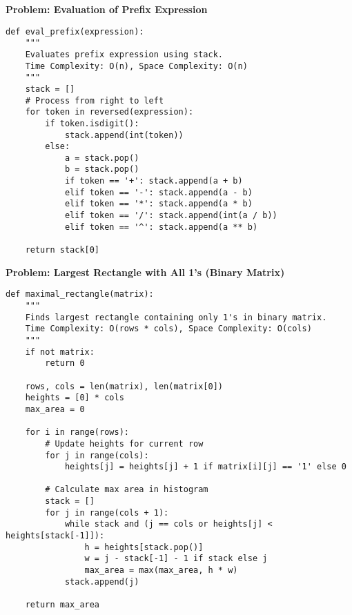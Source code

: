 \noindent\textbf{Problem: Evaluation of Prefix Expression}
\begin{verbatim}
def eval_prefix(expression):
    """
    Evaluates prefix expression using stack.
    Time Complexity: O(n), Space Complexity: O(n)
    """
    stack = []
    # Process from right to left
    for token in reversed(expression):
        if token.isdigit():
            stack.append(int(token))
        else:
            a = stack.pop()
            b = stack.pop()
            if token == '+': stack.append(a + b)
            elif token == '-': stack.append(a - b)
            elif token == '*': stack.append(a * b)
            elif token == '/': stack.append(int(a / b))
            elif token == '^': stack.append(a ** b)
    
    return stack[0]
\end{verbatim}

\noindent\textbf{Problem: Largest Rectangle with All 1's (Binary Matrix)}
\begin{verbatim}
def maximal_rectangle(matrix):
    """
    Finds largest rectangle containing only 1's in binary matrix.
    Time Complexity: O(rows * cols), Space Complexity: O(cols)
    """
    if not matrix:
        return 0
    
    rows, cols = len(matrix), len(matrix[0])
    heights = [0] * cols
    max_area = 0
    
    for i in range(rows):
        # Update heights for current row
        for j in range(cols):
            heights[j] = heights[j] + 1 if matrix[i][j] == '1' else 0
        
        # Calculate max area in histogram
        stack = []
        for j in range(cols + 1):
            while stack and (j == cols or heights[j] < heights[stack[-1]]):
                h = heights[stack.pop()]
                w = j - stack[-1] - 1 if stack else j
                max_area = max(max_area, h * w)
            stack.append(j)
    
    return max_area
\end{verbatim}

% 
